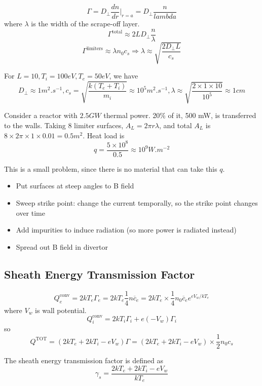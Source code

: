 \documentclass[12pt]{article}
\begin{document}
 $$\Gamma = D_\perp \frac{dn}{dr} \Big |_{r=a} = D_\perp \frac{n}{lambda}$$
 where $\lambda$ is the width of the scrape-off layer.
 $$\Gamma^{\text{total}} \approx 2LD_\perp \frac{n}{\lambda}$$
 $$\Gamma^{\text{limiters}} \approx \lambda n_0c_s \Rightarrow \lambda \approx \sqrt{\frac{2D_\perp L}{c_s}}$$

 \begin{ex}[JET]
     For $L = 10, T_i = 100\unit{eV}, T_e = 50\unit{eV}$, we have
     $$D_\perp \approx 1 \unit{m^2.s^{-1}}, c_s = \sqrt{\frac{k(T_e+T_i)}{m_i}} \approx 10^5 \unit{m^2.s^{-1}}, \lambda \approx \sqrt{\frac{2\times1\times10}{10^5}} \approx 1\unit{cm}$$
 \end{ex}

 \begin{ex}[Reactor]
     Consider a reactor with $2.5 \unit{GW}$ thermal power. 20\% of it, 500 mW, is transferred to the walls. Taking 8 limiter surfaces, $A_L = 2\pi r\lambda$, and total $A_L$ is $8 \times 2\pi \times 1 \times 0.01 = 0.5 \unit{m^2}$. Heat load is
     $$q = \frac{5\times10^8}{0.5} \approx 10^9 \unit{W.m^{-2}}$$
 \end{ex}

 This is a small problem, since there is no material that can take this $q$.

\begin{itemize}
    \item Put surfaces at steep angles to B field
    \item Sweep strike point: change the current temporally, so the strike point changes over time
    \item Add impurities to induce radiation (so more power is radiated instead)
    \item Spread out B field in divertor
\end{itemize}

\subsection{Sheath Energy Transmission Factor}

$$Q_e^{\text{conv}} = 2kT_e\Gamma_e = 2kT_e \frac{1}{4} n \overline c_e = 2kT_e \times \frac{1}{4} n_0 \overline c_e e^{eV_w/kT_e}$$
where $V_w$ is wall potential.
$$Q_i^{\text{conv}} = 2kT_i\Gamma_i + e(-V_w)\Gamma_i$$
so
$$Q^{\text{TOT}} = (2kT_e + 2kT_i - eV_w) \Gamma = (2kT_e + 2kT_i - eV_w) \times \frac{1}{2} n_0 c_s$$

\begin{defn}
    The sheath energy transmission factor is defined as
    $$\gamma_s = \frac{2kT_e+2kT_i-eV_w}{kT_e}$$
\end{defn}
\end{document}

